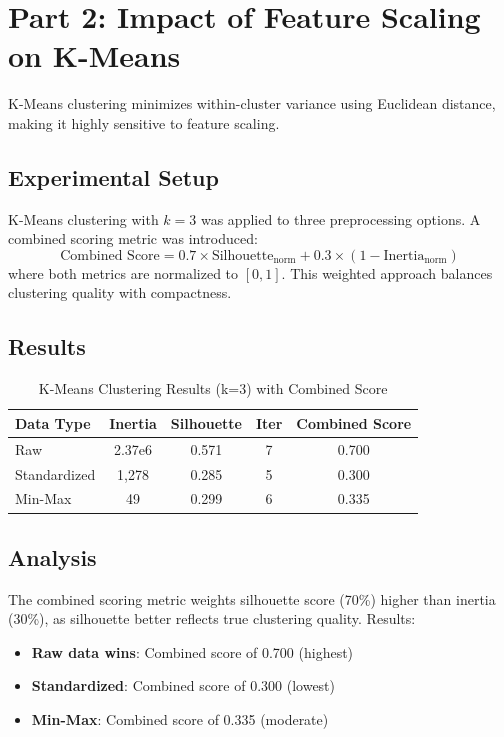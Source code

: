 \documentclass[12pt,a4paper]{article}
\begin{document}
\section{Part 2: Impact of Feature Scaling on K-Means}

K-Means clustering minimizes within-cluster variance using Euclidean distance, making it highly sensitive to feature scaling.

\subsection{Experimental Setup}

K-Means clustering with $k=3$ was applied to three preprocessing options. A combined scoring metric was introduced:
\[
\text{Combined Score} = 0.7 \times \text{Silhouette}_\text{norm} + 0.3 \times (1 - \text{Inertia}_\text{norm})
\]
where both metrics are normalized to $[0, 1]$. This weighted approach balances clustering quality with compactness.

\subsection{Results}

\begin{table}[H]
\centering
\caption{K-Means Clustering Results (k=3) with Combined Score}
\label{tab:kmeans_scaling}
\begin{tabular}{lcccc}
\toprule
\textbf{Data Type} & \textbf{Inertia} & \textbf{Silhouette} & \textbf{Iter} & \textbf{Combined Score} \\
\midrule
Raw & 2.37e6 & 0.571 & 7 & 0.700 \\
Standardized & 1,278 & 0.285 & 5 & 0.300 \\
Min-Max & 49 & 0.299 & 6 & 0.335 \\
\bottomrule
\end{tabular}
\end{table}

\subsection{Analysis}

The combined scoring metric weights silhouette score (70\%) higher than inertia (30\%), as silhouette better reflects true clustering quality. Results:
\begin{itemize}
    \item \textbf{Raw data wins}: Combined score of 0.700 (highest)
    \item \textbf{Standardized}: Combined score of 0.300 (lowest)
    \item \textbf{Min-Max}: Combined score of 0.335 (moderate)
\end{itemize}
\end{document}

